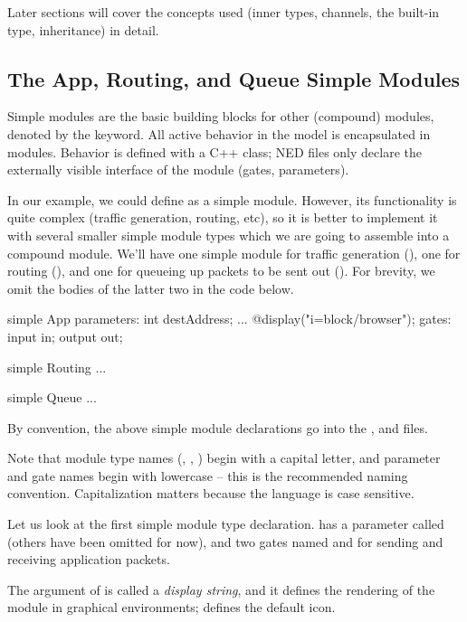 Later sections will cover the concepts used (inner types, channels, the
 built-in type, inheritance) in detail.


\subsection{The App, Routing, and Queue Simple Modules}
Simple modules are the basic building blocks for other (compound) modules, 
denoted by the  keyword.
All active behavior in the model is encapsulated in  modules.
Behavior is defined with a C++ class; NED files only declare the externally
visible interface of the module (gates, parameters).

In our example, we could define  as a simple module. However,
its functionality is quite complex (traffic generation, routing, etc),
so it is better to implement it with several smaller simple module types
which we are going to assemble into a compound module. We'll have
one simple module for traffic generation (), one for routing
(), and one for queueing up packets to be sent out ().
For brevity, we omit the bodies of the latter two in the code below.

\begin{ned}
simple App
{
    parameters:
        int destAddress;
        ...
        @display("i=block/browser");
    gates:
        input in;
        output out;
}

simple Routing
{
    ...
}

simple Queue
{
    ...
}
\end{ned}

By convention, the above simple module declarations go into the
,  and  files.

\begin{note}
    Note that module type names (, , )
    begin with a capital letter, and parameter and gate names begin with
    lowercase -- this is the recommended naming convention. Capitalization
    matters because the language is case sensitive.
\end{note}

Let us look at the first simple module type declaration.  has a
parameter called  (others have been omitted for now),
and two gates named  and  for sending and receiving
application packets.

The argument of  is called a \textit{display string},
and it defines the rendering of the module in graphical environments;
 defines the default icon.

